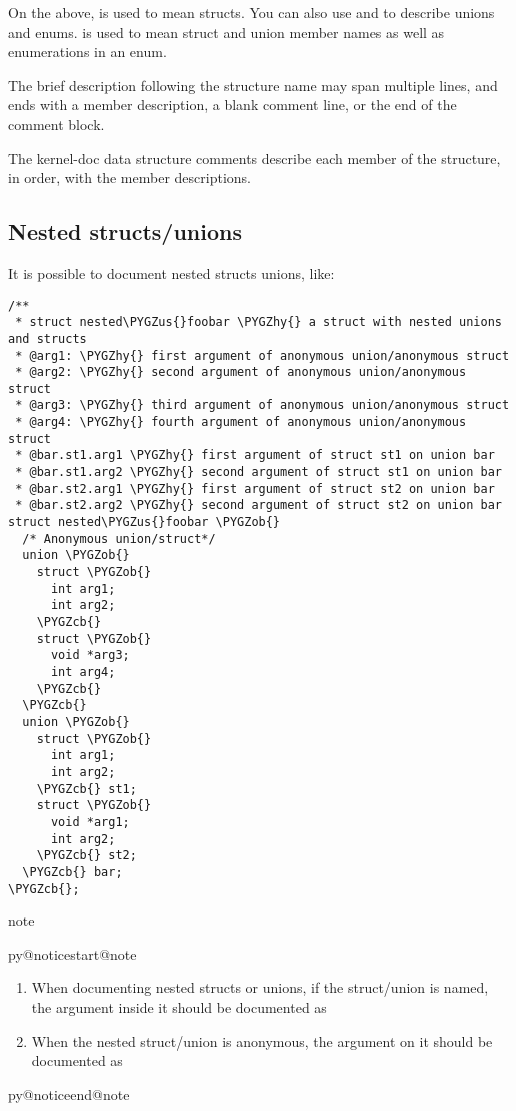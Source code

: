 \documentclass[a4paper,8pt,english]{sphinxmanual}
\makeatletter
\renewenvironment{notice}[2]{%
          \def\py@noticetype{#1}
          \begin{coloredbox}{#1}
          \bf\it
          \par\strong{#2}
          \csname py@noticestart@#1\endcsname
        }
	{
          \csname py@noticeend@\py@noticetype\endcsname
          \end{coloredbox}
        }
\def\PYGZus{\char`\_}
\def\PYGZob{\char`\{}
\def\PYGZcb{\char`\}}
\def\PYGZhy{\char`\-}
\makeatother
\begin{document}
On the above,  is used to mean structs. You can also use 
and   to describe unions and enums.  is used
to mean struct and union member names as well as enumerations in an enum.

The brief description following the structure name may span multiple lines, and
ends with a member description, a blank comment line, or the end of the
comment block.

The kernel-doc data structure comments describe each member of the structure,
in order, with the member descriptions.


\subsection{Nested structs/unions}
\label{doc-guide/kernel-doc:nested-structs-unions}
It is possible to document nested structs unions, like:

\begin{Verbatim}[commandchars=\\\{\}]
/**
 * struct nested\PYGZus{}foobar \PYGZhy{} a struct with nested unions and structs
 * @arg1: \PYGZhy{} first argument of anonymous union/anonymous struct
 * @arg2: \PYGZhy{} second argument of anonymous union/anonymous struct
 * @arg3: \PYGZhy{} third argument of anonymous union/anonymous struct
 * @arg4: \PYGZhy{} fourth argument of anonymous union/anonymous struct
 * @bar.st1.arg1 \PYGZhy{} first argument of struct st1 on union bar
 * @bar.st1.arg2 \PYGZhy{} second argument of struct st1 on union bar
 * @bar.st2.arg1 \PYGZhy{} first argument of struct st2 on union bar
 * @bar.st2.arg2 \PYGZhy{} second argument of struct st2 on union bar
struct nested\PYGZus{}foobar \PYGZob{}
  /* Anonymous union/struct*/
  union \PYGZob{}
    struct \PYGZob{}
      int arg1;
      int arg2;
    \PYGZcb{}
    struct \PYGZob{}
      void *arg3;
      int arg4;
    \PYGZcb{}
  \PYGZcb{}
  union \PYGZob{}
    struct \PYGZob{}
      int arg1;
      int arg2;
    \PYGZcb{} st1;
    struct \PYGZob{}
      void *arg1;
      int arg2;
    \PYGZcb{} st2;
  \PYGZcb{} bar;
\PYGZcb{};
\end{Verbatim}

\begin{notice}{note}{Note:}\begin{enumerate}
\item {} 
When documenting nested structs or unions, if the struct/union 
is named, the argument  inside it should be documented as

\item {} 
When the nested struct/union is anonymous, the argument  on it
should be documented as 

\end{enumerate}
\end{notice}
\end{document}
